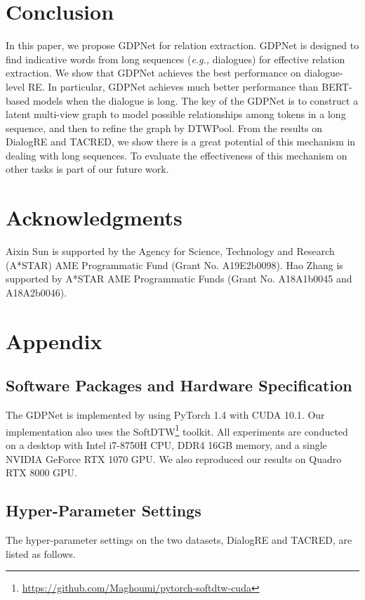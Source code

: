 \documentclass[letterpaper]{article} \usepackage{aaai21}  \usepackage{times}  \usepackage{helvet} \usepackage{courier}  \usepackage[hyphens]{url}  \usepackage{graphicx} \urlstyle{rm} \def\UrlFont{\rm}  \usepackage{graphicx}  \usepackage{natbib}  \usepackage{caption}
\newcommand{\eg}{\emph{e.g.,}\xspace}
\begin{document}
\section{Conclusion}


In this paper, we propose GDPNet for relation extraction. GDPNet is designed to find indicative words from long sequences (\eg dialogues) for effective relation extraction. We show that GDPNet achieves the best performance on dialogue-level RE. In particular, GDPNet achieves much better performance than BERT-based models when the dialogue is long. The key of the GDPNet is to construct a latent multi-view graph to model possible relationships among tokens in a long sequence, and then to refine the graph by DTWPool. From the results on DialogRE and TACRED, we show there is a great potential of this mechanism in dealing with long sequences. To evaluate the effectiveness of this mechanism on other tasks is part of our future work.


\section{Acknowledgments}
Aixin Sun is supported by the Agency for Science, Technology and Research (A*STAR) AME Programmatic Fund (Grant No. A19E2b0098). Hao Zhang is supported by A*STAR AME Programmatic Funds (Grant No. A18A1b0045 and A18A2b0046).

\section{Appendix}


\subsection{Software Packages and Hardware Specification}
The GDPNet is implemented by using PyTorch 1.4 with CUDA 10.1. Our implementation also uses the SoftDTW\footnote{\url{https://github.com/Maghoumi/pytorch-softdtw-cuda}} toolkit. All experiments are conducted on a desktop with Intel i7-8750H CPU, DDR4 16GB memory, and a single NVIDIA GeForce RTX 1070 GPU. We also reproduced our results on Quadro RTX 8000 GPU.

\subsection{Hyper-Parameter Settings}

The hyper-parameter settings on the two datasets, DialogRE and TACRED, are listed as follows. 
\end{document}
